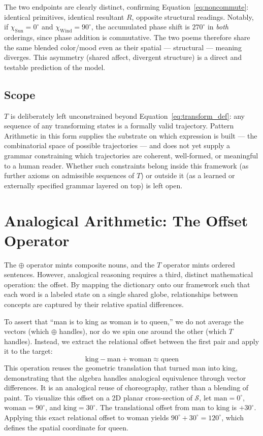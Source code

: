 \documentclass[12pt, a4paper]{article}
\begin{document}
The two endpoints are clearly distinct, confirming
Equation~\eqref{eq:noncommute}: identical primitives, identical
resultant $R$, opposite structural readings. Notably, if $\chi_{\text{Sun}}
= 0^\circ$ and $\chi_{\text{Wind}} = 90^\circ$, the accumulated phase
shift is $270^\circ$ in \emph{both} orderings, since phase addition is
commutative. The two poems therefore share the same blended color/mood
even as their spatial --- structural --- meaning diverges. This
asymmetry (shared affect, divergent structure) is a direct and
testable prediction of the model.

\subsection{Scope}
\label{subsec:transform_scope}
$T$ is deliberately left unconstrained beyond
Equation~\eqref{eq:transform_def}: any sequence of any transforming
states is a formally valid trajectory. Pattern Arithmetic in this form
supplies the substrate on which expression is built --- the
combinatorial space of possible trajectories --- and does not yet
supply a grammar constraining which trajectories are coherent,
well-formed, or meaningful to a human reader. Whether such constraints
belong inside this framework (as further axioms on admissible
sequences of $T$) or outside it (as a learned or externally specified
grammar layered on top) is left open.

\section{Analogical Arithmetic: The Offset Operator}
\label{sec:analogical_offset}

The $\oplus$ operator mints composite nouns, and the $T$ operator mints ordered sentences. However, analogical reasoning requires a third, distinct mathematical operation: the offset. By mapping the dictionary onto our framework such that each word is a labeled state on a single shared globe, relationships between concepts are captured by their relative spatial differences.

To assert that ``man is to king as woman is to queen,'' we do not average the vectors (which $\oplus$ handles), nor do we spin one around the other (which $T$ handles). Instead, we extract the relational offset between the first pair and apply it to the target:
\begin{equation}
    \text{king} - \text{man} + \text{woman} \approx \text{queen}
    \label{eq:analogical_offset}
\end{equation}
This operation reuses the geometric translation that turned man into king, demonstrating that the algebra handles analogical equivalence through vector differences. It is an analogical reuse of choreography, rather than a blending of paint.
To visualize this offset on a 2D planar cross-section of $\mathcal{S}$, let $\text{man} = 0^\circ$, $\text{woman} = 90^\circ$, and $\text{king} = 30^\circ$. The translational offset from $\text{man}$ to $\text{king}$ is $+30^\circ$. Applying this exact relational offset to $\text{woman}$ yields $90^\circ + 30^\circ = 120^\circ$, which defines the spatial coordinate for $\text{queen}$.
\end{document}
